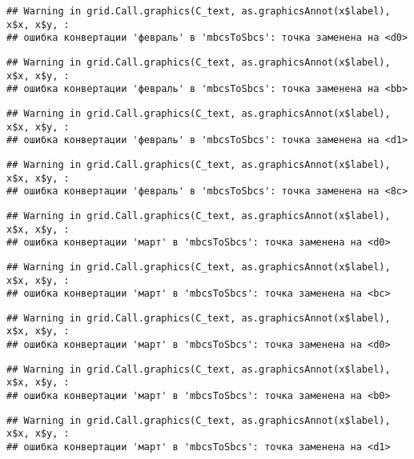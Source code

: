 \documentclass[
]{article}
\begin{document}
\begin{verbatim}
## Warning in grid.Call.graphics(C_text, as.graphicsAnnot(x$label), x$x, x$y, :
## ошибка конвертации 'февраль' в 'mbcsToSbcs': точка заменена на <d0>
\end{verbatim}

\begin{verbatim}
## Warning in grid.Call.graphics(C_text, as.graphicsAnnot(x$label), x$x, x$y, :
## ошибка конвертации 'февраль' в 'mbcsToSbcs': точка заменена на <bb>
\end{verbatim}

\begin{verbatim}
## Warning in grid.Call.graphics(C_text, as.graphicsAnnot(x$label), x$x, x$y, :
## ошибка конвертации 'февраль' в 'mbcsToSbcs': точка заменена на <d1>
\end{verbatim}

\begin{verbatim}
## Warning in grid.Call.graphics(C_text, as.graphicsAnnot(x$label), x$x, x$y, :
## ошибка конвертации 'февраль' в 'mbcsToSbcs': точка заменена на <8c>
\end{verbatim}

\begin{verbatim}
## Warning in grid.Call.graphics(C_text, as.graphicsAnnot(x$label), x$x, x$y, :
## ошибка конвертации 'март' в 'mbcsToSbcs': точка заменена на <d0>
\end{verbatim}

\begin{verbatim}
## Warning in grid.Call.graphics(C_text, as.graphicsAnnot(x$label), x$x, x$y, :
## ошибка конвертации 'март' в 'mbcsToSbcs': точка заменена на <bc>
\end{verbatim}

\begin{verbatim}
## Warning in grid.Call.graphics(C_text, as.graphicsAnnot(x$label), x$x, x$y, :
## ошибка конвертации 'март' в 'mbcsToSbcs': точка заменена на <d0>
\end{verbatim}

\begin{verbatim}
## Warning in grid.Call.graphics(C_text, as.graphicsAnnot(x$label), x$x, x$y, :
## ошибка конвертации 'март' в 'mbcsToSbcs': точка заменена на <b0>
\end{verbatim}

\begin{verbatim}
## Warning in grid.Call.graphics(C_text, as.graphicsAnnot(x$label), x$x, x$y, :
## ошибка конвертации 'март' в 'mbcsToSbcs': точка заменена на <d1>
\end{verbatim}
\end{document}
